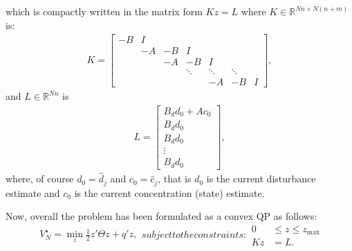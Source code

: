 \documentclass[12pt]{scrartcl}
\renewcommand{\Re}{\mathbb{R}}
\begin{document}
which is compactly written in the matrix form $Kz = L$ where $K\in\Re^{Nn\times N(n+m)}$ is:
\begin{align}
K=\left[\begin{array}{ccccccc}
-B & I\\
& -A & -B &I\\
&& -A & -B &I\\
&&&\ddots & \ddots & \ddots\\
&&&&-A&-B&I
\end{array}\right],
\end{align}
and $L\in \Re^{Nn}$ is
\begin{align}
L=\left[
\begin{array}{c}
B_d d_0 + Ac_0\\
B_d d_0\\
B_d d_0\\
\vdots\\
B_d d_0
\end{array}\right],
\end{align}
where, of course $d_0=\hat{d}_j$ and $c_0=\hat{c}_j$, that is
$d_0$ is the current disturbance estimate and $c_0$ is the current
concentration (state) estimate.

Now, overall the problem has been formulated as a convex QP as follows:
\begin{subequations}
\begin{align}
V_N^\star = \min_{z} \frac{1}{2}z'\Theta z + q'z,
\end{align}
subject to the constraints:
\begin{align}
0 &\leq z \leq z_{\max}\label{eq:z-bound}\\
Kz &= L.
\end{align}
\end{subequations}
\end{document}
